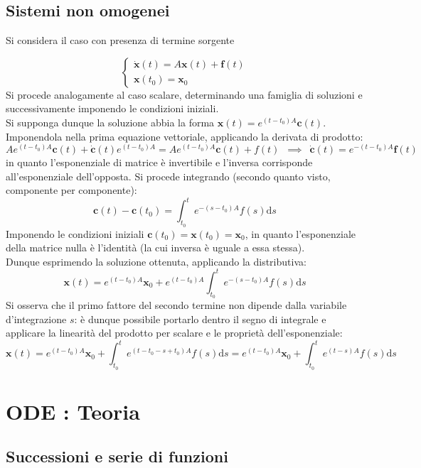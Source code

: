 \documentclass[10pt, oneside]{book}
\theoremstyle{plain}
\begin{document}
\section{Sistemi non omogenei}
Si considera il caso con presenza di termine sorgente

\[\begin{cases}
\dot{\mathbf{x}}(t) = A \mathbf{x}(t) + \mathbf{f}(t)\\
\mathbf{x}(t_0) = \mathbf{x}_0
\end{cases}\]
Si procede analogamente al caso scalare, determinando una famiglia di soluzioni e successivamente imponendo le condizioni iniziali.
\\Si supponga dunque la soluzione abbia la forma $\displaystyle \mathbf{x}(t) = e^{(t - t_0) A} \mathbf{c}(t)$. Imponendola nella prima equazione vettoriale, applicando la derivata di prodotto:
\[A e^{(t - t_0) A} \mathbf{c}(t) + \dot{\mathbf{c}}(t) e^{(t - t_0) A} = A e^{(t - t_0) A} \mathbf{c}(t) + f(t) \enspace \implies \enspace \dot{\mathbf{c}}(t) = e^{- (t - t_0) A} \mathbf{f}(t)\]
in quanto l'esponenziale di matrice è invertibile e l'inversa corrisponde all'esponenziale dell'opposta. Si procede integrando (secondo quanto visto, componente per componente):
\[\mathbf{c}(t) - \mathbf{c}(t_0) = \int_{t_0}^{t} e^{- (s - t_0) A} f(s)\textrm{d}s\]
Imponendo le condizioni iniziali $\mathbf{c}(t_0) = \mathbf{x}(t_0) = \mathbf{x}_0$, in quanto l'esponenziale della matrice nulla è l'identità (la cui inversa è uguale a essa stessa).
\\Dunque esprimendo la soluzione ottenuta, applicando la distributiva:
\[\mathbf{x}(t) = e^{(t - t_0) A}\mathbf{x}_0 + e^{(t - t_0) A} \int_{t_0}^{t} e^{- (s - t_0) A} f(s)\textrm{d}s\]
Si osserva che il primo fattore del secondo termine non dipende dalla variabile d'integrazione $s$: è dunque possibile portarlo dentro il segno di integrale e applicare la linearità del prodotto per scalare e le proprietà dell'esponenziale:
\[\mathbf{x}(t) = e^{(t - t_0) A}\mathbf{x}_0 + \int_{t_0}^{t} e^{(t - t_0 - s + t_0) A} f(s)\textrm{d}s = e^{(t - t_0) A}\mathbf{x}_0 + \int_{t_0}^{t} e^{(t - s) A} f(s)\textrm{d}s\]


\chapter{ODE : Teoria}
\section{Successioni e serie di funzioni}
\end{document}
